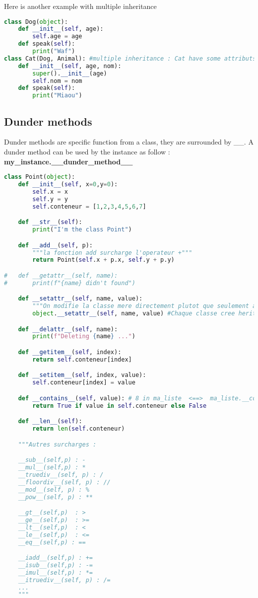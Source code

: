 \documentclass[a4paper, 12pt, titlepage]{scrartcl} %
\begin{document}
Here is another example with multiple inheritance
\begin{lstlisting}[language=Python]
class Dog(object):
	def __init__(self, age):
		self.age = age
	def speak(self):
		print("Waf")
class Cat(Dog, Animal): #multiple inheritance : Cat have some attributs from Dog but is also an Animal
	def __init__(self, age, nom):
		super().__init__(age)
		self.nom = nom
	def speak(self):
		print("Miaou")
\end{lstlisting} \vspace{5mm}

\subsection{Dunder methods}
Dunder methods are specific function from a class, they are surrounded by \_\_. A dunder method can be used by the instance as follow :\\ \textbf{my\_instance.\_\_dunder\_method\_\_}
\begin{lstlisting}[language=Python]
class Point(object):
	def __init__(self, x=0,y=0):
		self.x = x
		self.y = y
		self.conteneur = [1,2,3,4,5,6,7]

	def __str__(self):
		print("I'm the class Point")

	def __add__(self, p):
		"""la fonction add surcharge l'operateur +"""
		return Point(self.x + p.x, self.y + p.y)

#	def __getattr__(self, name):
#		print(f"{name} didn't found")

	def __setattr__(self, name, value):
		"""On modifie la classe mere directement plutot que seulement appeler setaatr de cette classe et tourner en boucle sur la meme methode"""
		object.__setattr__(self, name, value) #Chaque classe cree herite de base de la classe object

	def __delattr__(self, name):
		print(f"Deleting {name} ...")

	def __getitem__(self, index):
		return self.conteneur[index]

	def __setitem__(self, index, value):
		self.conteneur[index] = value

	def __contains__(self, value): # 8 in ma_liste  <==>  ma_liste.__contains__(8)
		return True if value in self.conteneur else False

	def __len__(self):
		return len(self.conteneur)

	"""Autres surcharges : 

	__sub__(self,p) : -
	__mul__(self,p) : *
	__truediv__(self, p) : /
	__floordiv__(self, p) : //
	__mod__(self, p) : %
	__pow__(self, p) : **

	__gt__(self,p)  : >
	__ge__(self,p) 	: >=
	__lt__(self,p)  : <
	__le__(self,p)  : <=
	__eq__(self,p) : == 

	__iadd__(self,p) : +=
	__isub__(self,p) : -=
	__imul__(self,p) : *=
	__itruediv__(self, p) : /=	
	...
	"""
\end{lstlisting} \vspace{5mm}
\end{document}
